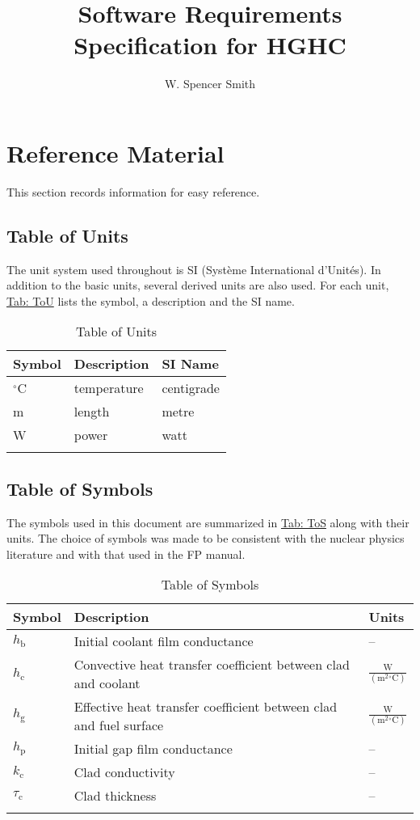\documentclass[12pt]{article}
\title{Software Requirements Specification for HGHC}
\author{W. Spencer Smith}
\begin{document}
\maketitle
\tableofcontents
\newpage
\section{Reference Material}
\label{Sec:RefMat}
This section records information for easy reference.

\subsection{Table of Units}
\label{Sec:ToU}
The unit system used throughout is SI (Système International d'Unités). In addition to the basic units, several derived units are also used. For each unit, \hyperref[Table:ToU]{Tab: ToU} lists the symbol, a description and the SI name.

\begin{longtable}{l l l}
\toprule
\textbf{Symbol} & \textbf{Description} & \textbf{SI Name}
\\
\midrule
\endhead
${}^{\circ}$C & temperature & centigrade
\\
m & length & metre
\\
W & power & watt
\\
\bottomrule
\caption{Table of Units}
\label{Table:ToU}
\end{longtable}
\subsection{Table of Symbols}
\label{Sec:ToS}
The symbols used in this document are summarized in \hyperref[Table:ToS]{Tab: ToS} along with their units. The choice of symbols was made to be consistent with the nuclear physics literature and with that used in the FP manual.

\begin{longtabu}{l X[l] l}
\toprule
\textbf{Symbol} & \textbf{Description} & \textbf{Units}
\\
\midrule
\endhead
${h_{\text{b}}}$ & Initial coolant film conductance & --
\\
${h_{\text{c}}}$ & Convective heat transfer coefficient between clad and coolant & $\frac{\text{W}}{(\text{m}^{2}{}^{\circ}\text{C})}$
\\
${h_{\text{g}}}$ & Effective heat transfer coefficient between clad and fuel surface & $\frac{\text{W}}{(\text{m}^{2}{}^{\circ}\text{C})}$
\\
${h_{\text{p}}}$ & Initial gap film conductance & --
\\
${k_{\text{c}}}$ & Clad conductivity & --
\\
${τ_{\text{c}}}$ & Clad thickness & --
\\
\bottomrule
\caption{Table of Symbols}
\label{Table:ToS}
\end{longtabu}
\end{document}
